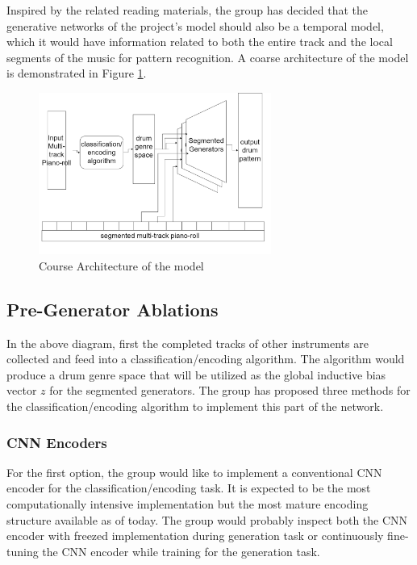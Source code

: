 \begin{par}
    \par \hspace{15pt} Inspired by the related reading materials, the group has decided that the generative networks of the project's model should also be a temporal model, which it would have information related to both the entire track and the local segments of the music for pattern recognition. A coarse architecture of the model is demonstrated in Figure \ref{fig:archie}. 

    \begin{figure}[H]
        \centering
        \includegraphics[width=3in]{image/proposal_architecture}
        \caption{Course Architecture of the model}
        \label{fig:archie}
    \end{figure}
    
    \subsection{Pre-Generator Ablations} %
    \label{sub:Pre-Generator Ablations}
    \par In the above diagram, first the completed tracks of other instruments are collected and feed into a classification/encoding algorithm. The algorithm would produce a drum genre space that will be utilized as the global inductive bias vector $z$ for the segmented generators. The group has proposed three methods for the classification/encoding algorithm to implement this part of the network.

        \subsubsection{CNN Encoders} %
        \label{ssub:Convolution Neural Network Encoders}
            \par For the first option, the group would like to implement a conventional CNN encoder for the classification/encoding task. It is expected to be the most computationally intensive implementation but the most mature encoding structure available as of today. The group would probably inspect both the CNN encoder with freezed implementation during generation task or continuously fine-tuning the CNN encoder while training for the generation task.


\end{par}

